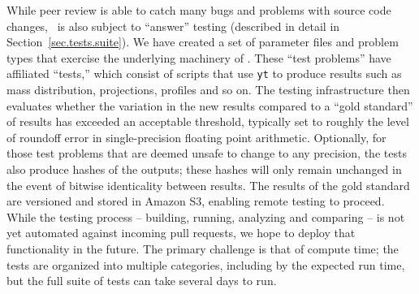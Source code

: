 While peer review is able to catch many bugs and problems with source
code changes, \enzo\ is also subject to ``answer'' testing (described
in detail in Section~\ref{sec.tests.suite}).  We have created a set of
parameter files and problem types that exercise the underlying
machinery of \enzo.  These ``test problems'' have affiliated
``tests,'' which consist of scripts that use \texttt{yt}
\citep{2011ApJS..192....9T} to produce results such as mass
distribution, projections, profiles and so on.  The testing
infrastructure then evaluates whether the variation in the new results
compared to a ``gold standard'' of results has exceeded an acceptable
threshold, typically set to roughly the level of roundoff error in
single-precision floating point arithmetic.  Optionally, for those
test problems that are deemed unsafe to change to any precision, the
tests also produce hashes of the outputs; these hashes will only
remain unchanged in the event of bitwise identicality between results.
The results of the gold standard are versioned and stored in Amazon
S3, enabling remote testing to proceed.  While the testing process --
building, running, analyzing and comparing -- is not yet automated
against incoming pull requests, we hope to deploy that functionality
in the future.  The primary challenge is that of compute time; the
tests are organized into multiple categories, including by the
expected run time, but the full suite of tests can take several days
to run.
